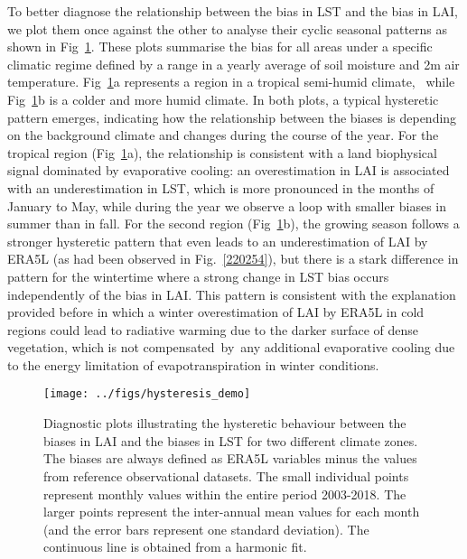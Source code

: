 \documentclass[gmd, manuscript]{copernicus}
\begin{document}
{To better diagnose the relationship between the bias in LST and the bias
in LAI, we plot them once against the other to analyse their cyclic
seasonal patterns as shown in Fig~{\ref{842529}}. These
plots summarise the bias for all areas under a specific climatic regime
defined by a range in a yearly average of soil moisture and 2m air
temperature. Fig~{\ref{842529}}a represents a region in
a tropical semi-humid climate,~ while
Fig~{\ref{842529}}b is a colder and more humid climate.
In both plots, a typical hysteretic pattern emerges, indicating how the
relationship between the biases is depending on the background climate
and changes during the course of the year. For the tropical region
(Fig~{\ref{842529}}a), the relationship is consistent
with a land biophysical signal dominated by evaporative cooling: an
overestimation in LAI is associated with an underestimation in LST,
which is more pronounced in the months of January to May, while during
the year we observe a loop with smaller biases in summer than in fall.
For the second region (Fig~{\ref{842529}}b), the
growing season follows a stronger hysteretic pattern that even leads to
an underestimation of LAI by ERA5L (as had been observed in
Fig.~{\ref{220254}}), but there is a stark difference
in pattern for the wintertime where a strong change in LST bias occurs
independently of the bias in LAI. This pattern is consistent with the
explanation provided before in which a winter overestimation of LAI by
ERA5L in cold regions could lead to radiative warming due to the darker
surface of dense vegetation, which is not compensated~by~any additional
evaporative cooling due to the energy limitation of evapotranspiration
in winter conditions.~

\par\null{}
\begin{figure}[H]
\begin{center}
\texttt{[image: ../figs/hysteresis\_demo]}
\caption{{Diagnostic plots illustrating the hysteretic behaviour between the
biases in LAI and the biases in LST for two different climate zones. The
biases are always defined as ERA5L variables minus the values from
reference observational datasets. The small individual points represent
monthly values within the entire period 2003-2018. The larger points
represent the inter-annual mean values for each month (and the error
bars represent one standard deviation). The continuous line is obtained
from a harmonic fit.
{\label{842529}}%
}}
\end{center}
\end{figure}



}
\end{document}

